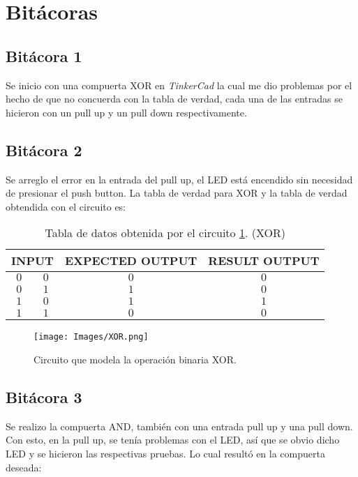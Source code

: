  

\section{Bitácoras}

\subsection{Bitácora 1}
Se inicio con una compuerta XOR en \textit{TinkerCad} la cual me dio problemas por el hecho de que no concuerda con la tabla de verdad, cada una de las entradas se hicieron con un pull up y un pull down respectivamente.

\subsection{Bitácora 2}
Se arreglo el error en la entrada del pull up, el LED está encendido sin necesidad de presionar el push button. La tabla de verdad para XOR y la tabla de verdad obtendida con el circuito es:

\begin{table}[H]
	\centering
	\caption{Tabla de datos obtenida por el circuito \ref{XORi}. (XOR)}
	\label{XOR}
	\begin{tabular}{||c|c||c|c||}
		\hline
		\hline
		\multicolumn{2}{||c||}{INPUT} & EXPECTED OUTPUT & RESULT OUTPUT \\
		\hline
		\hline
		$0$ & $0$ & $0$ & $0$ \\
		$0$ & $1$ & $1$ & $0$ \\
		$1$ & $0$ & $1$ & $1$ \\		
		$1$ & $1$ & $0$ & $0$ \\
		\hline
		\hline
	\end{tabular}
\end{table}

\begin{figure}[H]
	\centering
	\label{XORi}
	\texttt{[image: Images/XOR.png]}
	\caption{Circuito que modela la operación binaria XOR.}
\end{figure}


\subsection{Bitácora 3}

Se realizo la compuerta AND, también con una entrada pull up y una pull down. Con esto, en la pull up, se tenía problemas con el LED, así que se obvio dicho LED y se hicieron las respectivas pruebas. Lo cual resultó en la compuerta deseada:

